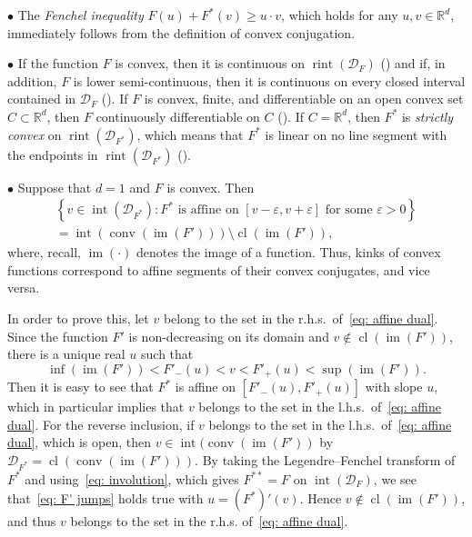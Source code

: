 \documentclass[10pt]{amsart}
\theoremstyle{definition}\newtheorem{defi}[theo]{Definition}\newtheorem{rema}[theo]{Remark}\newtheorem{exam}[theo]{Example}\newtheorem{exem}[theo]{Example}\newtheorem{nota}[theo]{Notation}
\DeclareMathOperator{\conv}{conv}
\DeclareMathOperator{\im}{im}
\DeclareMathOperator{\cl}{cl}
\DeclareMathOperator{\rint}{rint}
\DeclareMathOperator{\intr}{int}
\newcommand{\Rbb}{\mathbb{R}}
\newcommand{\Dcl}{\mathcal{D}}
\begin{document}
$\bullet$ The \emph{Fenchel inequality} $F(u) + F^*(v) \ge u \cdot v$, which holds for any $u, v \in \Rbb^d$, immediately follows from the definition of convex conjugation.


$\bullet$ If the function $F$ is convex, then it is continuous on $\rint (\Dcl_F)$ (\cite[Theorem~10.1]{Rockafellar}) and if, in addition, $F$ is lower semi-continuous, then it is continuous on every closed interval contained in $\Dcl_F$ (\cite[Corollary~7.5.1]{Rockafellar}). If $F$ is convex, finite, and differentiable on an open convex set $C \subset \Rbb^d$, then $F$ continuously differentiable on $C$ (\cite[Corollary~25.5.1]{Rockafellar}). If $C=\Rbb^d$, then $F^*$ is \emph{strictly convex} on $\rint (\Dcl_{F^*})$, which means that $F^*$ is linear on no line segment with the endpoints in $\rint (\Dcl_{F^*})$ (\cite[Theorem~26.3]{Rockafellar}).

$\bullet$ Suppose that $d=1$ and $F$ is convex. Then
\begin{multline}\label{eq: affine dual}
\left\{v \in \intr(\Dcl_{F^*}): F^* \text{ is affine on } [v-\varepsilon, v+\varepsilon] \text{ for some } \varepsilon >0\right\} \\ = \intr (\conv(\im (F'))) \setminus \cl(\im (F')),
\end{multline}
where, recall, $\im(\cdot)$ denotes the image of a function. Thus, kinks of convex functions correspond to affine segments of their convex conjugates, and vice versa.

In order to prove this, let $v$ belong to the set in the r.h.s.\ of~\eqref{eq: affine dual}. Since the function $F'$ is non-decreasing on its domain and $v \notin \cl(\im (F'))$, there is a unique real $u$ such that
\begin{equation}\label{eq: F' jumps}
\inf (\im (F')) < F'_-(u) < v < F'_+(u) < \sup (\im (F')).
\end{equation}
Then it is easy to see that $F^*$ is affine on $[F'_-(u), F'_+(u)]$ with slope $u$, which in particular implies that $v$ belongs to the set in the l.h.s.\ of~\eqref{eq: affine dual}. For the reverse inclusion, if $v$ belongs to the set in the l.h.s.\ of~\eqref{eq: affine dual}, which is open, then $v \in \intr \bigl(\conv(\im (F'))$ by $\Dcl_{F^*} = \cl (\conv(\im (F')))$. By taking the Legendre--Fenchel transform of $F^*$ and using~\eqref{eq: involution}, which gives $F^{**}=F$ on $\intr(\Dcl_F)$, we see that~\eqref{eq: F' jumps} holds true with $u=(F^*)'(v)$. Hence $v \not \in \cl(\im (F'))$, and thus $v$ belongs to the set in the r.h.s. of~\eqref{eq: affine dual}.
\end{document}
